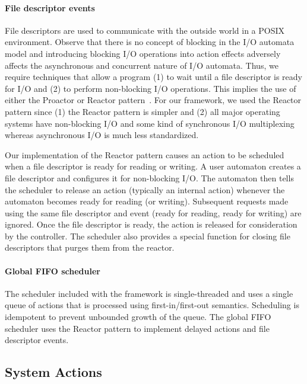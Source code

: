 \paragraph*{File descriptor events}
File descriptors are used to communicate with the outside world in a POSIX environment.
Observe that there is no concept of blocking in the I/O automata model and introducing blocking I/O operations into action effects adversely affects the asynchronous and concurrent nature of I/O automata.
Thus, we require techniques that allow a program (1) to wait until a file descriptor is ready for I/O and (2) to perform non-blocking I/O operations.
This implies the use of either the Proactor or Reactor pattern~\cite{schmidt2000pattern}.
For our framework, we used the Reactor pattern since (1) the Reactor pattern is simpler and (2) all major operating systems have non-blocking I/O and some kind of synchronous I/O multiplexing whereas asynchronous I/O is much less standardized.

Our implementation of the Reactor pattern causes an action to be scheduled when a file descriptor is ready for reading or writing.
A user automaton creates a file descriptor and configures it for non-blocking I/O.
The automaton then tells the scheduler to release an action (typically an internal action) whenever the automaton becomes ready for reading (or writing).
Subsequent requests made using the same file descriptor and event (ready for reading, ready for writing) are ignored.
Once the file descriptor is ready, the action is released for consideration by the controller.
The scheduler also provides a special function for closing file descriptors that purges them from the reactor.

\paragraph*{Global FIFO scheduler}
The scheduler included with the framework is single-threaded and uses a single queue of actions that is processed using first-in/first-out semantics.
Scheduling is idempotent to prevent unbounded growth of the queue.
The global FIFO scheduler uses the Reactor pattern to implement delayed actions and file descriptor events.

\subsection{System Actions\label{system_action_section}}

